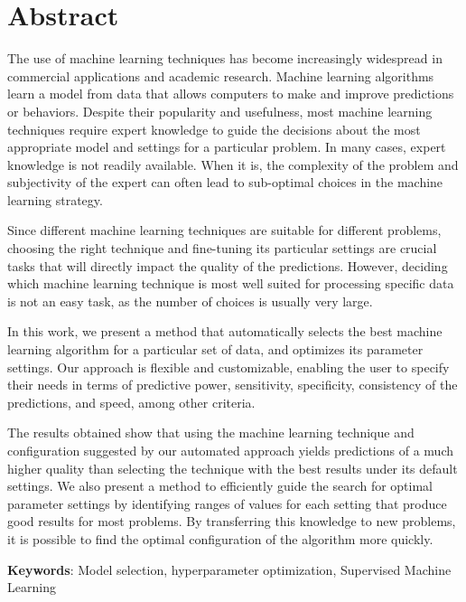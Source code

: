 \cleardoublepage
\chapter*{Abstract}

The use of machine learning techniques has become increasingly widespread in commercial applications and academic research. Machine learning algorithms learn a model from data that allows computers to make and improve predictions or behaviors.  Despite their popularity and usefulness, most machine learning techniques require expert knowledge to guide the decisions about the most appropriate model and settings for a particular problem. In many cases, expert knowledge is not readily available. When it is, the complexity of the problem and subjectivity of the expert can often lead to sub-optimal choices in the machine learning strategy.

\vskip0.2cm
Since different machine learning techniques are suitable for different problems, choosing the right
technique and fine-tuning its particular settings are crucial tasks that will directly impact the
quality of the predictions. However, deciding which machine learning technique is most well suited for processing specific data is not an easy task, as the number of choices is usually very large.

\vskip0.2cm
In this work, we present a method that automatically selects the best machine learning algorithm for a particular set of data, and optimizes its parameter settings. Our approach is flexible and customizable, enabling the user to specify their needs in terms of predictive power, sensitivity, specificity, consistency of the predictions, and speed, among other criteria.

\vskip0.2cm
The results obtained show that using the machine learning technique and configuration suggested by our automated approach yields predictions of a much higher quality than selecting the technique with the best results under its default settings. We also present a method to efficiently guide the search for optimal parameter settings by identifying ranges of values for each setting that produce good results for most problems. By transferring this knowledge to new problems, it is possible to find the optimal configuration of the algorithm more quickly.

\vskip0.5cm
{\bf Keywords}:
Model selection, hyperparameter optimization, Supervised Machine Learning
